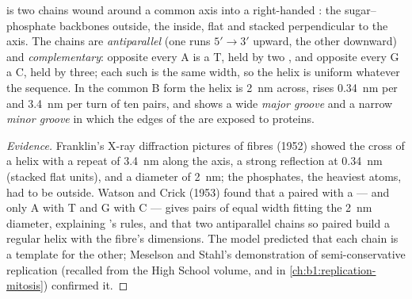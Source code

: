 \begin{theorem}\label{thm:b1:nucleic-acids:helix}
 is two  chains wound around a common axis into a
right-handed \emph{}: the sugar--phosphate backbones
outside, the  inside, flat and stacked perpendicular to the axis.
The chains are \emph{antiparallel} (one runs $5' \to 3'$ upward, the
other downward) and \emph{complementary}: opposite every A is a T,
held by two , and opposite every G a C, held by three;
each such \emph{} is the same width, so the helix is uniform
whatever the sequence. In the common B form the helix is \qty{2}{nm}
across, rises \qty{0.34}{nm} per  and \qty{3.4}{nm} per turn
of ten pairs, and shows a wide \emph{major groove} and a narrow
\emph{minor groove} in which the edges of the  are exposed to
proteins.
\end{theorem}
\begin{proof}[Evidence]
Franklin's X-ray diffraction pictures of  fibres (1952) showed the
cross of a helix with a repeat of \qty{3.4}{nm} along the axis, a
strong reflection at \qty{0.34}{nm} (stacked flat units), and a
diameter of \qty{2}{nm}; the phosphates, the heaviest atoms, had to be
outside. Watson and Crick (1953) found that a  paired with a
 --- and only A with T and G with C --- gives pairs of equal
width fitting the \qty{2}{nm} diameter, explaining 's rules,
and that two antiparallel chains so paired build a regular helix with
the fibre's dimensions. The model predicted that each chain is a
template for the other; Meselson and Stahl's demonstration of
semi-conservative replication (recalled from the High School volume,
and in \cref{ch:b1:replication-mitosis}) confirmed it.
\end{proof}

